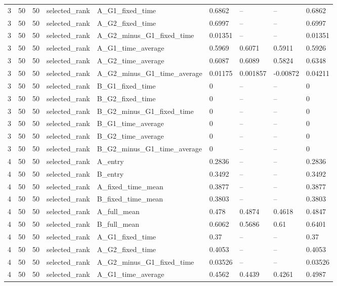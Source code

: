 \begin{longtable}{lllllllll}
3 & 50 & 50 & selected\_rank & A\_G1\_fixed\_time & 0.6862 & -- & -- & 0.6862 \\
3 & 50 & 50 & selected\_rank & A\_G2\_fixed\_time & 0.6997 & -- & -- & 0.6997 \\
3 & 50 & 50 & selected\_rank & A\_G2\_minus\_G1\_fixed\_time & 0.01351 & -- & -- & 0.01351 \\
3 & 50 & 50 & selected\_rank & A\_G1\_time\_average & 0.5969 & 0.6071 & 0.5911 & 0.5926 \\
3 & 50 & 50 & selected\_rank & A\_G2\_time\_average & 0.6087 & 0.6089 & 0.5824 & 0.6348 \\
3 & 50 & 50 & selected\_rank & A\_G2\_minus\_G1\_time\_average & 0.01175 & 0.001857 & -0.00872 & 0.04211 \\
3 & 50 & 50 & selected\_rank & B\_G1\_fixed\_time & 0 & -- & -- & 0 \\
3 & 50 & 50 & selected\_rank & B\_G2\_fixed\_time & 0 & -- & -- & 0 \\
3 & 50 & 50 & selected\_rank & B\_G2\_minus\_G1\_fixed\_time & 0 & -- & -- & 0 \\
3 & 50 & 50 & selected\_rank & B\_G1\_time\_average & 0 & -- & -- & 0 \\
3 & 50 & 50 & selected\_rank & B\_G2\_time\_average & 0 & -- & -- & 0 \\
3 & 50 & 50 & selected\_rank & B\_G2\_minus\_G1\_time\_average & 0 & -- & -- & 0 \\
4 & 50 & 50 & selected\_rank & A\_entry & 0.2836 & -- & -- & 0.2836 \\
4 & 50 & 50 & selected\_rank & B\_entry & 0.3492 & -- & -- & 0.3492 \\
4 & 50 & 50 & selected\_rank & A\_fixed\_time\_mean & 0.3877 & -- & -- & 0.3877 \\
4 & 50 & 50 & selected\_rank & B\_fixed\_time\_mean & 0.3803 & -- & -- & 0.3803 \\
4 & 50 & 50 & selected\_rank & A\_full\_mean & 0.478 & 0.4874 & 0.4618 & 0.4847 \\
4 & 50 & 50 & selected\_rank & B\_full\_mean & 0.6062 & 0.5686 & 0.61 & 0.6401 \\
4 & 50 & 50 & selected\_rank & A\_G1\_fixed\_time & 0.37 & -- & -- & 0.37 \\
4 & 50 & 50 & selected\_rank & A\_G2\_fixed\_time & 0.4053 & -- & -- & 0.4053 \\
4 & 50 & 50 & selected\_rank & A\_G2\_minus\_G1\_fixed\_time & 0.03526 & -- & -- & 0.03526 \\
4 & 50 & 50 & selected\_rank & A\_G1\_time\_average & 0.4562 & 0.4439 & 0.4261 & 0.4987 \\

\end{longtable}
